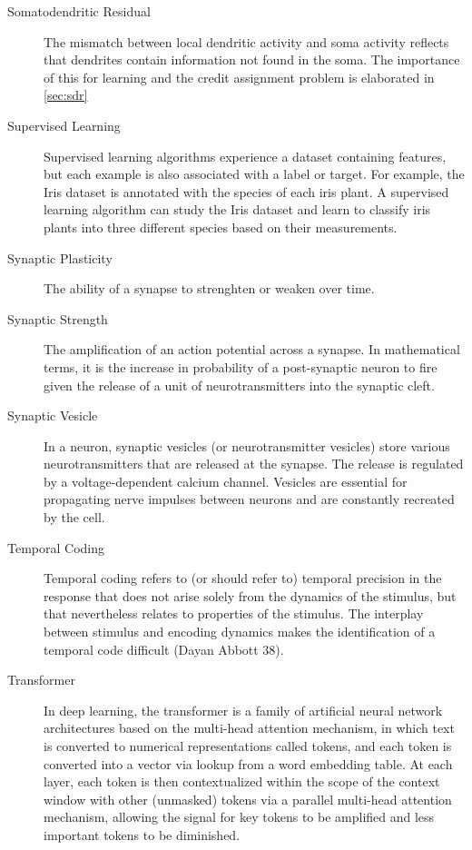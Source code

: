 \documentclass[11pt, a4paper]{article}
\begin{document}
\begin{description}
    \item[Somatodendritic Residual] The mismatch between local dendritic activity and soma activity reflects that dendrites contain information not found in the soma. The importance of this for learning and the credit assignment problem is elaborated in \ref{sec:sdr}

    \item[Supervised Learning] Supervised learning algorithms experience a dataset containing features, but each example is also associated with a label or target. For example, the Iris dataset is annotated with the species of each iris plant. A supervised learning algorithm can study the Iris dataset and learn to classify iris plants into three different species based on their measurements.

    \item[Synaptic Plasticity] The ability of a synapse to strenghten or weaken over time.

    \item[Synaptic Strength] The amplification of an action potential across a synapse. In mathematical terms, it is the increase in probability of a post-synaptic neuron to fire given the release of a unit of neurotransmitters into the synaptic cleft.

    \item[Synaptic Vesicle] In a neuron, synaptic vesicles (or neurotransmitter vesicles) store various neurotransmitters that are released at the synapse. The release is regulated by a voltage-dependent calcium channel. Vesicles are essential for propagating nerve impulses between neurons and are constantly recreated by the cell.

    \item[Temporal Coding] Temporal coding refers to (or should
refer to) temporal precision in the response that does not arise solely from
the dynamics of the stimulus, but that nevertheless relates to properties
of the stimulus. The interplay between stimulus and encoding dynamics
makes the identification of a temporal code difficult (Dayan Abbott 38).

    \item[Transformer] In deep learning, the transformer is a family of artificial neural network architectures based on the multi-head attention mechanism, in which text is converted to numerical representations called tokens, and each token is converted into a vector via lookup from a word embedding table. At each layer, each token is then contextualized within the scope of the context window with other (unmasked) tokens via a parallel multi-head attention mechanism, allowing the signal for key tokens to be amplified and less important tokens to be diminished.
    

\end{description}
\end{document}
